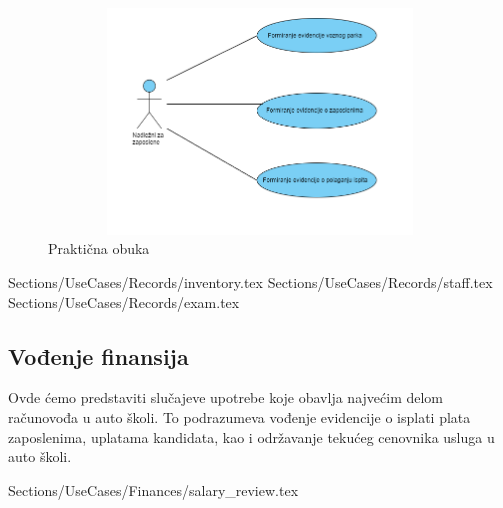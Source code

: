 \begin{figure}[H]
    \begin{center}
        \includegraphics[width=120mm, height=60mm]{Diagrams/evidencija.png}
    \end{center}
    \caption {Praktična obuka}
    \label{usecase_praktična obuka}

\end{figure}

 {Sections/UseCases/Records/inventory.tex}
 {Sections/UseCases/Records/staff.tex}
 {Sections/UseCases/Records/exam.tex}


\subsection {Vođenje finansija}
Ovde ćemo predstaviti slučajeve upotrebe koje obavlja najvećim delom računovođa u auto školi.
To podrazumeva vođenje evidencije o isplati plata zaposlenima, uplatama kandidata, kao i održavanje tekućeg cenovnika usluga u auto školi.

 {Sections/UseCases/Finances/salary_review.tex}



